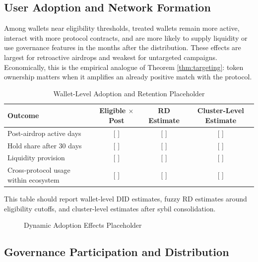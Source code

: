 \documentclass[11pt]{article}
\theoremstyle{remark}
\begin{document}
\subsection{User Adoption and Network Formation}

Among wallets near eligibility thresholds, treated wallets remain more active, interact with more protocol contracts, and are more likely to supply liquidity or use governance features in the months after the distribution. These effects are largest for retroactive airdrops and weakest for untargeted campaigns. Economically, this is the empirical analogue of Theorem \ref{thm:targeting}: token ownership matters when it amplifies an already positive match with the protocol.

\begin{table}[H]
\centering
\begin{threeparttable}
\caption{Wallet-Level Adoption and Retention Placeholder}
\label{tab:retention}
\begin{tabular}{lccc}
\toprule
Outcome & Eligible $\times$ Post & RD Estimate & Cluster-Level Estimate \\
\midrule
Post-airdrop active days & [ ] & [ ] & [ ] \\
Hold share after 30 days & [ ] & [ ] & [ ] \\
Liquidity provision & [ ] & [ ] & [ ] \\
Cross-protocol usage within ecosystem & [ ] & [ ] & [ ] \\
\bottomrule
\end{tabular}
\begin{tablenotes}
\footnotesize
\item This table should report wallet-level DID estimates, fuzzy RD estimates around eligibility cutoffs, and cluster-level estimates after sybil consolidation.
\end{tablenotes}
\end{threeparttable}
\end{table}

\begin{figure}[H]
\centering
{}
\caption{Dynamic Adoption Effects Placeholder}
\label{fig:adoption}
\end{figure}

\subsection{Governance Participation and Distribution}
\end{document}
